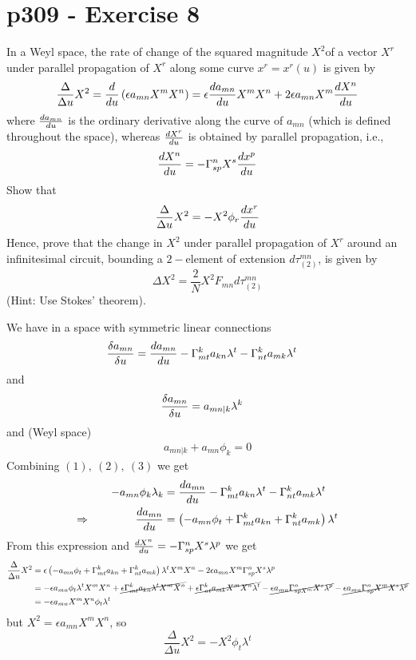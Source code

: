 \section{p309 - Exercise 8}
\begin{tcolorbox}
In a Weyl space, the rate of change of the squared magnitude $X^2$of a vector $X^r$ under parallel propagation of $X^r$ along some curve $x^r=x^r(u)$ is given  by
$$ \frac{\Delta}{\Delta u} X^2 = \dv{}{u}\left(\epsilon a_{mn}X^mX^n\right) = \epsilon \dv{a_{mn}}{u}X^mX^n +2\epsilon a_{mn} X^m\dv{X^n}{u}$$
where $\dv{a_{mn}}{u}$ is the ordinary derivative along the curve of $a_{mn}$ (which is defined throughout the space), whereas $\dv{X^r}{u}$ is obtained by parallel propagation, i.e.,
$$\dv{X^n}{u} = -\Gamma^n_{sp}X^s\dv{x^p}{u}$$
Show that 
$$\frac{\Delta}{\Delta u} X^2 = -X^2\phi_r\dv{x^r}{u}$$
Hence, prove that the change in $X^2$ under parallel propagation of $X^r$ around an infinitesimal circuit, bounding a $2-$element of extension $d\tau_{(2)}^{mn}$, is given by
$$\Delta X^2= \frac{2}{N}X^2F_{mn}d\tau_{(2)}^{mn}$$
(Hint: Use Stokes' theorem).
\end{tcolorbox}
We have in a space with symmetric linear connections
\begin{align}
\fdv{a_{mn}}{u} &= \dv{a_{mn}}{u} - \Gamma^k_{mt} a_{kn}\lambda^t - \Gamma^k_{nt} a_{mk}\lambda^t
\end{align}
and 
\begin{align}
\fdv{a_{mn}}{u} &= a_{mn|k}\lambda^k
\end{align}
and (Weyl space)
\begin{align}
a_{mn|k}+ a_{mn}\phi_k=0
\end{align}
Combining $(1),\ (2),\ (3)$ we get
\begin{align*}
-a_{mn}\phi_k\lambda_k &= \dv{a_{mn}}{u} - \Gamma^k_{mt} a_{kn}\lambda^t - \Gamma^k_{nt} a_{mk}\lambda^t\\
\Rightarrow\quad\quad\quad\quad \dv{a_{mn}}{u} &= \left(-a_{mn}\phi_t + \Gamma^k_{mt} a_{kn} + \Gamma^k_{nt} a_{mk}\right)\lambda^t
\end{align*}
From this expression and $ \dv{X^n}{u} = -\Gamma^n_{sp}X^s\lambda^p$ we get
\begin{align*}
\frac{\Delta}{\Delta u} X^2 &=\epsilon\left(-a_{mn}\phi_t + \Gamma^k_{mt} a_{kn} + \Gamma^k_{nt} a_{mk}\right)\lambda^tX^mX^n -2\epsilon a_{mn} X^m\Gamma^n_{sp}X^s\lambda^p\\
&=-\epsilon a_{mn}\phi_t\lambda^tX^mX^n  + \cancel{\epsilon\Gamma^k_{mt} a_{kn}\lambda^tX^mX^n }+ \cancel{\epsilon \Gamma^k_{nt} a_{mk}X^mX^n\lambda^t } -\cancel{\epsilon a_{mn}\Gamma^n_{sp X^m}X^s\lambda^p}-\cancel{\epsilon a_{mn} \Gamma^n_{sp}X^mX^s\lambda^p}\\
&=-\epsilon a_{mn}X^mX^n \phi_t \lambda^t
\end{align*}
but $X^2= \epsilon a_{mn} X^mX^n$, so
$$\frac{\Delta}{\Delta u} X^2 = -X^2\phi_t  \lambda^t$$


